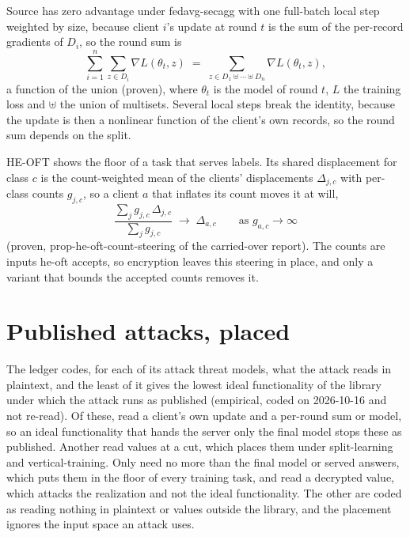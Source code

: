 \documentclass{labreport}
\begin{document}
Source has zero advantage under fedavg-secagg with one full-batch local step weighted by size, because client $i$'s update at round $t$ is the sum of the per-record gradients of $D_i$, so the round sum is
\[
  \sum_{i=1}^{n}\sum_{z\in D_i}\nabla L(\theta_t,z)\;=\;\sum_{z\in D_1\uplus\cdots\uplus D_n}\nabla L(\theta_t,z),
\]
a function of the union (proven), where $\theta_t$ is the model of round $t$, $L$ the training loss and $\uplus$ the union of multisets.
Several local steps break the identity, because the update is then a nonlinear function of the client's own records, so the round sum depends on the split.

HE-OFT shows the floor of a task that serves labels.
Its shared displacement for class $c$ is the count-weighted mean of the clients' displacements $\Delta_{j,c}$ with per-class counts $g_{j,c}$, so a client $a$ that inflates its count moves it at will,
\[
  \frac{\sum_{j} g_{j,c}\,\Delta_{j,c}}{\sum_{j} g_{j,c}}\;\longrightarrow\;\Delta_{a,c}\qquad\text{as } g_{a,c}\to\infty
\]
(proven, prop-he-oft-count-steering of the carried-over report).
The counts are inputs he-oft accepts, so encryption leaves this steering in place, and only a variant that bounds the accepted counts removes it.



\section{Published attacks, placed}

The ledger codes, for each of its  attack threat models, what the attack reads in plaintext, and the least of it gives the lowest ideal functionality of the library under which the attack runs as published (empirical, coded on 2026-10-16 and not re-read).
Of these,  read a client's own update and  a per-round sum or model, so an ideal functionality that hands the server only the final model stops these  as published.
Another  read values at a cut, which places them under split-learning and vertical-training.
Only  need no more than the final model or served answers, which puts them in the floor of every training task, and  read a decrypted value, which attacks the realization and not the ideal functionality.
The other  are coded as reading nothing in plaintext or values outside the library, and the placement ignores the input space an attack uses.
\end{document}
